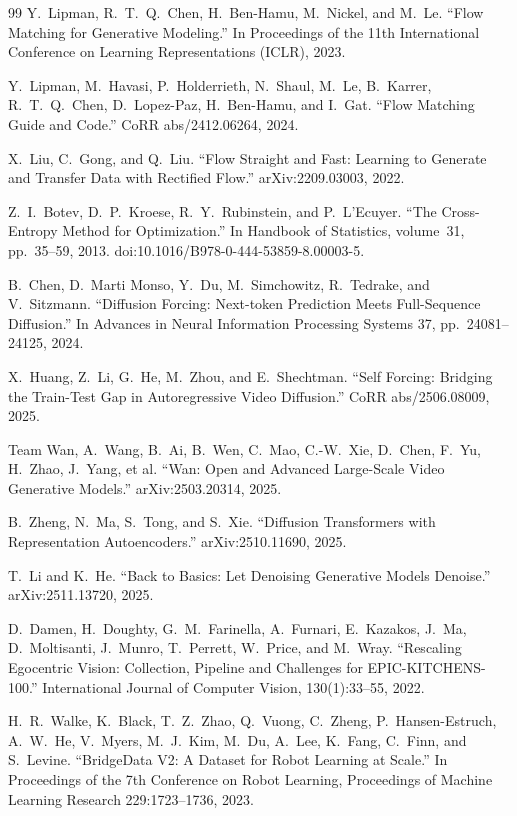 \documentclass[12pt]{report}
\begin{document}
\begin{thebibliography}{99}
Y.~Lipman, R.~T.~Q.~Chen, H.~Ben-Hamu, M.~Nickel, and M.~Le.
``Flow Matching for Generative Modeling.''
In Proceedings of the 11th International Conference on Learning Representations (ICLR), 2023.

Y.~Lipman, M.~Havasi, P.~Holderrieth, N.~Shaul, M.~Le, B.~Karrer, R.~T.~Q.~Chen, D.~Lopez-Paz, H.~Ben-Hamu, and I.~Gat.
``Flow Matching Guide and Code.''
CoRR abs/2412.06264, 2024.

X.~Liu, C.~Gong, and Q.~Liu.
``Flow Straight and Fast: Learning to Generate and Transfer Data with Rectified Flow.''
arXiv:2209.03003, 2022.

Z.~I.~Botev, D.~P.~Kroese, R.~Y.~Rubinstein, and P.~L'Ecuyer.
``The Cross-Entropy Method for Optimization.''
In Handbook of Statistics, volume~31,
pp.~35--59, 2013.
doi:10.1016/B978-0-444-53859-8.00003-5.

B.~Chen, D.~Marti Monso, Y.~Du, M.~Simchowitz, R.~Tedrake, and V.~Sitzmann.
``Diffusion Forcing: Next-token Prediction Meets Full-Sequence Diffusion.''
In Advances in Neural Information Processing Systems 37,
pp.~24081--24125, 2024.

X.~Huang, Z.~Li, G.~He, M.~Zhou, and E.~Shechtman.
``Self Forcing: Bridging the Train-Test Gap in Autoregressive Video Diffusion.''
CoRR abs/2506.08009, 2025.

Team Wan, A.~Wang, B.~Ai, B.~Wen, C.~Mao, C.-W.~Xie, D.~Chen, F.~Yu, H.~Zhao, J.~Yang, et al.
``Wan: Open and Advanced Large-Scale Video Generative Models.''
arXiv:2503.20314, 2025.

B.~Zheng, N.~Ma, S.~Tong, and S.~Xie.
``Diffusion Transformers with Representation Autoencoders.''
arXiv:2510.11690, 2025.

T.~Li and K.~He.
``Back to Basics: Let Denoising Generative Models Denoise.''
arXiv:2511.13720, 2025.

D.~Damen, H.~Doughty, G.~M.~Farinella, A.~Furnari, E.~Kazakos, J.~Ma, D.~Moltisanti, J.~Munro, T.~Perrett, W.~Price, and M.~Wray.
``Rescaling Egocentric Vision: Collection, Pipeline and Challenges for EPIC-KITCHENS-100.''
International Journal of Computer Vision, 130(1):33--55, 2022.

H.~R.~Walke, K.~Black, T.~Z.~Zhao, Q.~Vuong, C.~Zheng, P.~Hansen-Estruch, A.~W.~He, V.~Myers, M.~J.~Kim, M.~Du, A.~Lee, K.~Fang, C.~Finn, and S.~Levine.
``BridgeData V2: A Dataset for Robot Learning at Scale.''
In Proceedings of the 7th Conference on Robot Learning, Proceedings of Machine Learning Research 229:1723--1736, 2023.


\end{thebibliography}
\end{document}
